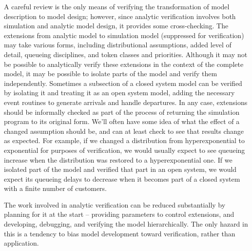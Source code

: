 A careful review is the only means of verifying the transformation of model
description to model design; however, since analytic verification involves
both simulation and analytic model design, it provides some cross-checking.
The extensions from analytic model to simulation model (suppressed for
verification) may take various forms, including distributional assumptions,
added level of detail, queueing disciplines, and token classes and priorities.
Although it may not be possible to analytically verify these extensions in the
context of the complete model, it may be possible to isolate parts of the
model and verify them independently. Sometimes a subsection of a closed system
model can be verified by isolating it and treating it as an open system model,
adding the necessary event routines to generate arrivals and handle
departures. In any case, extensions should be informally checked as part of
the process of returning the simulation program to its original form. We'll
often have some idea of what the effect of a changed assumption should be, and
can at least check to see that results change as expected. For example, if we
changed a distribution from hyperexponential to exponential for purposes of
verification, we would usually expect to see queueing increase when the
distribution was restored to a hyperexponential one. If we isolated part of
the model and verified that part in an open system, we would expect its
queueing delays to decrease when it becomes part of a closed system with a
finite number of customers.

The work involved in analytic verification can be reduced substantially by
planning for it at the start -- providing parameters to control extensions,
and developing, debugging, and verifying the model hierarchically. The only
hazard in this is a tendency to bias model development toward verification,
rather than application.

